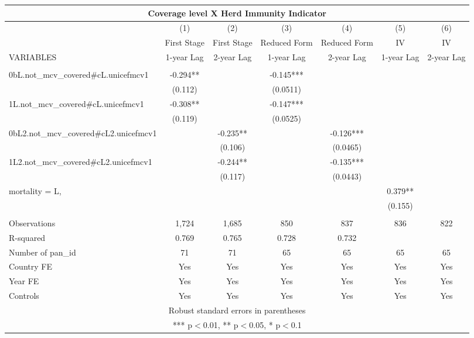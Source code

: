 \documentclass[]{article}
\begin{document}
\begin{tabular}{lcccccc}
\multicolumn{7}{c}{Coverage level X Herd Immunity Indicator} \\ \hline
 & (1) & (2) & (3) & (4) & (5) & (6) \\
 & First Stage & First Stage & Reduced Form & Reduced Form & IV & IV \\
VARIABLES & 1-year Lag & 2-year Lag & 1-year Lag & 2-year Lag & 1-year Lag & 2-year Lag \\ \hline
 &  &  &  &  &  &  \\
0bL.not\_mcv\_covered\#cL.unicefmcv1 & -0.294** &  & -0.145*** &  &  &  \\
 & (0.112) &  & (0.0511) &  &  &  \\
1L.not\_mcv\_covered\#cL.unicefmcv1 & -0.308** &  & -0.147*** &  &  &  \\
 & (0.119) &  & (0.0525) &  &  &  \\
0bL2.not\_mcv\_covered\#cL2.unicefmcv1 &  & -0.235** &  & -0.126*** &  &  \\
 &  & (0.106) &  & (0.0465) &  &  \\
1L2.not\_mcv\_covered\#cL2.unicefmcv1 &  & -0.244** &  & -0.135*** &  &  \\
 &  & (0.117) &  & (0.0443) &  &  \\
mortality = L, &  &  &  &  & 0.379** &  \\
 &  &  &  &  & (0.155) &  \\
 &  &  &  &  &  &  \\
Observations & 1,724 & 1,685 & 850 & 837 & 836 & 822 \\
R-squared & 0.769 & 0.765 & 0.728 & 0.732 &  &  \\
Number of pan\_id & 71 & 71 & 65 & 65 & 65 & 65 \\
Country FE & Yes & Yes & Yes & Yes & Yes & Yes \\
Year FE & Yes & Yes & Yes & Yes & Yes & Yes \\
 Controls & Yes & Yes & Yes & Yes & Yes & Yes \\ \hline
\multicolumn{7}{c}{ Robust standard errors in parentheses} \\
\multicolumn{7}{c}{ *** p$<$0.01, ** p$<$0.05, * p$<$0.1} \\
\end{tabular}
\end{document}
